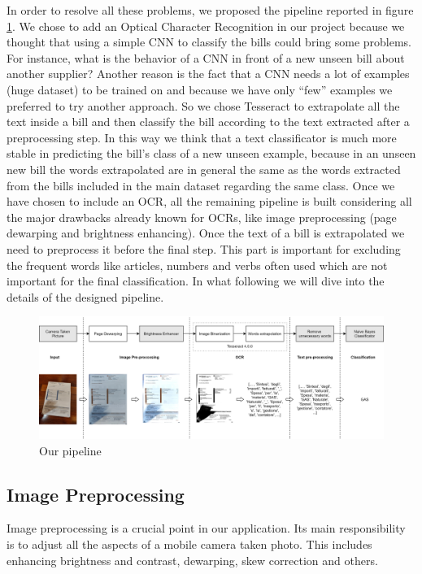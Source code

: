 \documentclass[10pt,twocolumn,letterpaper]{article}
\begin{document}
In order to resolve all these problems, we proposed the pipeline reported in
figure \ref{fig:pipeline}. We chose to add an Optical Character
Recognition in our project because we thought that using a simple CNN
to classify the bills could bring some problems. For instance, what is the
behavior of a CNN in front of a new unseen bill about another
supplier? Another reason is the fact that a CNN needs a lot of examples
(huge dataset) to be trained on and because we have only ``few''
examples we preferred to try another approach. So we chose Tesseract to
extrapolate all the text inside a bill and then classify the bill
according to the text extracted after a preprocessing step. In this
way we think that a text classificator is much more stable in
predicting the bill's class of a new unseen example, because in an
unseen new bill the words extrapolated are in general the same as the
words extracted from the bills included in the main dataset regarding the same class. Once we
have chosen to include an OCR, all the remaining pipeline is built
considering all the major drawbacks already known for OCRs, like image
preprocessing (page dewarping and brightness enhancing). Once the text
of a bill is extrapolated we need to preprocess it before the final
step. This part is important for excluding the frequent words like
articles, numbers and verbs often used which are not important for the final
classification. In what following we will dive into the details of the
designed pipeline.

\begin{figure}[!ht]
  \centering
  \includegraphics[width=1.0\textwidth]{images/pipeline.png}
  \caption{Our pipeline}
  \label{fig:pipeline}
\end{figure}

\subsection{Image Preprocessing}

Image preprocessing is a crucial point in our application. Its
main responsibility is to adjust all the aspects of a mobile camera
taken photo. This includes enhancing brightness and contrast,
dewarping, skew correction and others.
\end{document}
